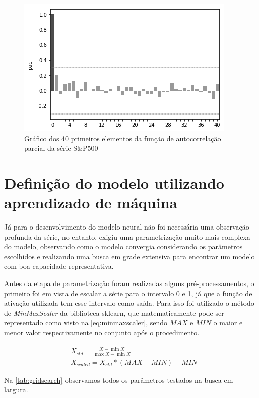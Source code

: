 \documentclass[
    12pt,
    oneside,
    a4paper,
    english,
    brazil
]{abntex2}
\begin{document}
\begin{figure}[ht]
    \centering
    \caption{Gráfico  dos 40  primeiros elementos  da função  de autocorrelação
    parcial da série S\&P500}\label{fig:sp500pacf}
    \includegraphics[width=.5\linewidth]{images/sp500pacf.png}
\end{figure}

\section{Definição do modelo utilizando aprendizado de máquina}

Já para  o desenvolvimento do modelo  neural não foi necessária  uma observação
profunda da  série, no entanto,  exigiu uma parametrização muito  mais complexa
do  modelo,  observando como  o  modelo  convergia considerando  os  parâmetros
escolhidos e realizando  uma busca em grade extensiva para  encontrar um modelo
com boa capacidade representativa.

Antes da etapa de parametrização  foram realizadas alguns pré-processamentos, o
primeiro foi  em vista  de escalar a  série para o  intervalo 0  e 1, já  que a
função  de  ativação  utilizada  tem  esse  intervalo  como  saída.  Para  isso
foi  utilizado o  método de  \textit{MinMaxScaler} da  biblioteca sklearn,  que
matematicamente pode ser representado  como visto na \autoref{eq:minmaxscaler},
sendo $MAX$ e  $MIN$ o maior e  menor valor respectivamente no  conjunto após o
procedimento.

\begin{align}\label{eq:minmaxscaler}
    &X_{std} = \frac{X - \min X}{\max X-\min X}\\
    &X_{scaled} = X_{std} * (MAX-MIN)+MIN
\end{align}

Na \autoref{tab:gridsearch} observamos todos os parâmetros testados na busca em
largura.
\end{document}
